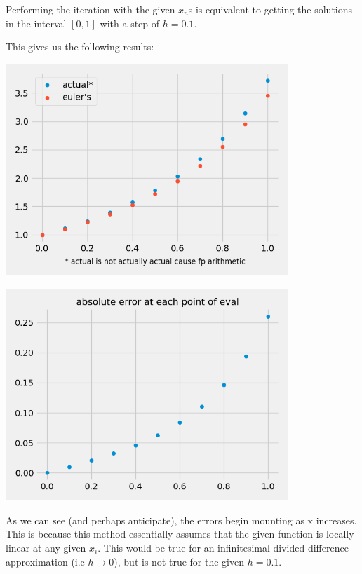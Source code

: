 Performing the iteration with the given $x_n$s is equivalent to getting the solutions in the interval $[0, 1]$ with a step of $h = 0.1$.\bigskip

This gives us the following results:
\begin{center}
    \includegraphics*[width=0.8\textwidth]{res/1.2-divergence.png}
\end{center}

\begin{center}
    \includegraphics*[width=0.8\textwidth]{res/1.2-error.png}
\end{center}

As we can see (and perhaps anticipate), the errors begin mounting as x increases. This is because this method essentially assumes that the given function is locally linear at any given $x_i$. This would be true for an infinitesimal divided difference approximation (i.e $h \rightarrow 0$), but is not true for the given $h = 0.1$.
